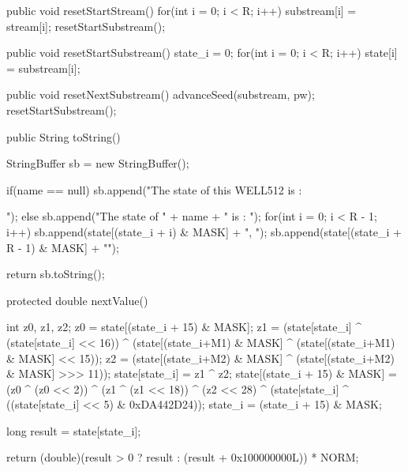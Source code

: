 \begin{code}
  \begin{hide}
   public void resetStartStream() {
      for(int i = 0; i < R; i++)
         substream[i] = stream[i];
      resetStartSubstream();
   }

   public void resetStartSubstream() {
      state_i = 0;
      for(int i = 0; i < R; i++)
         state[i] = substream[i];
   }

   public void resetNextSubstream() {
      advanceSeed(substream, pw);
      resetStartSubstream();
   }

   public String toString()  {
      StringBuffer sb = new StringBuffer();

      if(name == null)
         sb.append("The state of this WELL512 is : {");
      else
         sb.append("The state of " + name + " is : {");
      for(int i = 0; i < R - 1; i++)
         sb.append(state[(state_i + i) & MASK] + ", ");
      sb.append(state[(state_i + R - 1) & MASK] + "}");

      return sb.toString();
   }

   protected double nextValue() {
      int z0, z1, z2;
      z0 = state[(state_i + 15) & MASK];
      z1 = (state[state_i] ^ (state[state_i] << 16)) ^
           (state[(state_i+M1) & MASK] ^ (state[(state_i+M1) & MASK] << 15));
      z2 = (state[(state_i+M2) & MASK] ^
           (state[(state_i+M2) & MASK] >>> 11));
      state[state_i] = z1 ^ z2;
      state[(state_i + 15) & MASK] = (z0 ^ (z0 << 2)) ^ (z1 ^ (z1 << 18)) ^
                       (z2 << 28) ^ (state[state_i] ^
                           ((state[state_i] << 5) & 0xDA442D24));
      state_i = (state_i + 15) & MASK;

      long result = state[state_i];

      return (double)(result > 0 ? result : (result + 0x100000000L)) * NORM;
   }

}\end{hide}
\end{code}
